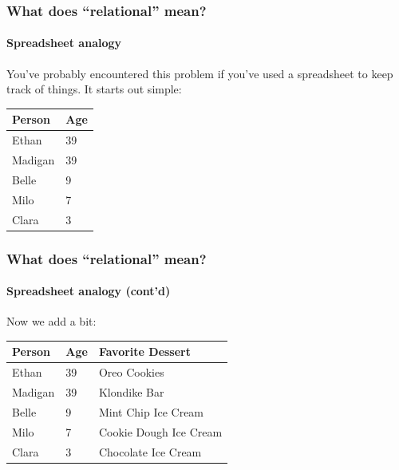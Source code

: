 \documentclass[aspectratio=169]{beamer}
\begin{document}
\begin{frame}
  \frametitle{What does ``relational'' mean?}
  \framesubtitle{Spreadsheet analogy}

  You've probably encountered this problem if you've used a spreadsheet to
  keep track of things. It starts out simple:

  \begin{table}[]
    \begin{tabular}{@{}ll@{}}
      \toprule
      Person  & Age \\ \midrule
      Ethan   & 39  \\
      Madigan & 39  \\
      Belle   & 9   \\
      Milo    & 7   \\
      Clara   & 3   \\ \bottomrule
    \end{tabular}
  \end{table}
\end{frame}

\begin{frame}
  \frametitle{What does ``relational'' mean?}
  \framesubtitle{Spreadsheet analogy (cont'd)}

  Now we add a bit:

  \begin{table}[]
    \begin{tabular}{@{}lll@{}}
      \toprule
      Person  & Age & Favorite Dessert       \\ \midrule
      Ethan   & 39  & Oreo Cookies           \\
      Madigan & 39  & Klondike Bar           \\
      Belle   & 9   & Mint Chip Ice Cream    \\
      Milo    & 7   & Cookie Dough Ice Cream \\
      Clara   & 3   & Chocolate Ice Cream    \\ \bottomrule
    \end{tabular}
  \end{table}
\end{frame}
\end{document}
